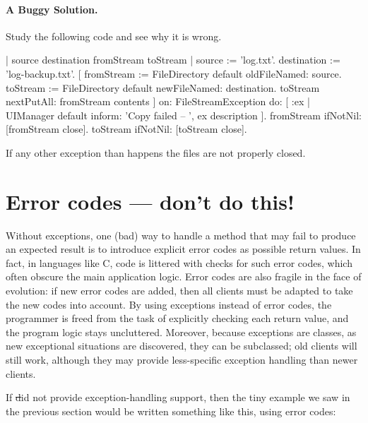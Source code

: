 \documentclass[a4paper,10pt,twoside]{book}
\begin{document}
\paragraph{A Buggy Solution.} Study the following code and see why it is wrong.

\begin{code}{}
| source destination fromStream toStream |
source := 'log.txt'.
destination := 'log-backup.txt'.
	[ fromStream := FileDirectory default oldFileNamed: source.
	toStream := FileDirectory default newFileNamed: destination.
	toStream nextPutAll: fromStream contents ]
		on: FileStreamException
		do: [ :ex | UIManager default inform: 'Copy failed -- ', ex description ].
	fromStream ifNotNil: [fromStream close].
	toStream ifNotNil: [toStream close].
\end{code}

If any other exception than  happens the files are not properly closed. 


\section{Error codes --- don't  do this!}

Without exceptions, one (bad) way to handle a method that may fail to produce an expected result is to introduce explicit error codes as possible return values. In fact, in languages like C, code is littered with checks for such error codes, which often obscure the main application logic.
Error codes are also fragile in the face of evolution: if new error codes are added, then all clients must be adapted to take the new codes into account. By using exceptions instead of error codes, the programmer is freed from the task of explicitly checking each return value, and the program logic stays uncluttered.
Moreover, because exceptions are classes, as new exceptional situations are discovered, they can be subclassed; old clients will still work, although they may provide less-specific exception handling than newer clients.

If \st did not provide exception-handling support, then the tiny example we saw in the previous section would be written something like this, using error codes:
\end{document}

